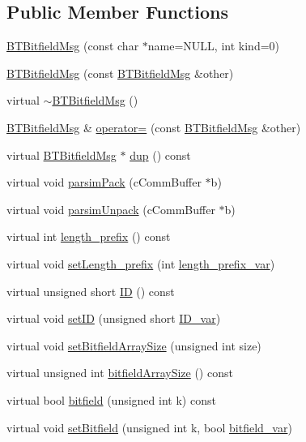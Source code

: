 \subsection*{Public Member Functions}
\begin{DoxyCompactItemize}
\item 
\hyperlink{classBTBitfieldMsg_ae71b7868e1f9b27629f6f391b352c911}{B\+T\+Bitfield\+Msg} (const char $\ast$name=N\+U\+L\+L, int kind=0)
\item 
\hyperlink{classBTBitfieldMsg_a3106cbcfeff6258360d37dd64ac337f8}{B\+T\+Bitfield\+Msg} (const \hyperlink{classBTBitfieldMsg}{B\+T\+Bitfield\+Msg} \&other)
\item 
virtual \hyperlink{classBTBitfieldMsg_a9233620b684aec4bbb3c1ae5db992962}{$\sim$\+B\+T\+Bitfield\+Msg} ()
\item 
\hyperlink{classBTBitfieldMsg}{B\+T\+Bitfield\+Msg} \& \hyperlink{classBTBitfieldMsg_a08e92e1add02c4b44de4b3c9805dff07}{operator=} (const \hyperlink{classBTBitfieldMsg}{B\+T\+Bitfield\+Msg} \&other)
\item 
virtual \hyperlink{classBTBitfieldMsg}{B\+T\+Bitfield\+Msg} $\ast$ \hyperlink{classBTBitfieldMsg_aa868c1c4c6f41c1e39eb740e7cd3f55f}{dup} () const 
\item 
virtual void \hyperlink{classBTBitfieldMsg_a8ae00cea21bf256b774a6a618516a1df}{parsim\+Pack} (c\+Comm\+Buffer $\ast$b)
\item 
virtual void \hyperlink{classBTBitfieldMsg_a793a3596151d3d008bf8268b30ab30a1}{parsim\+Unpack} (c\+Comm\+Buffer $\ast$b)
\item 
virtual int \hyperlink{classBTBitfieldMsg_a4b19acf793716974286b30e51a4ae6a6}{length\+\_\+prefix} () const 
\item 
virtual void \hyperlink{classBTBitfieldMsg_aa8a72966bdfa717d283efd63d1c77bc8}{set\+Length\+\_\+prefix} (int \hyperlink{classBTBitfieldMsg_a9040140b874e54a8dc67450a91ffb71b}{length\+\_\+prefix\+\_\+var})
\item 
virtual unsigned short \hyperlink{classBTBitfieldMsg_a0ab3c6abff00a0efe57031e83b34a926}{I\+D} () const 
\item 
virtual void \hyperlink{classBTBitfieldMsg_a80d7334c46ea207cdd2c269c155b7332}{set\+I\+D} (unsigned short \hyperlink{classBTBitfieldMsg_a9b73c5b2ce95effc48060f120ac49062}{I\+D\+\_\+var})
\item 
virtual void \hyperlink{classBTBitfieldMsg_a502a312ee81437e26312b20d3889d548}{set\+Bitfield\+Array\+Size} (unsigned int size)
\item 
virtual unsigned int \hyperlink{classBTBitfieldMsg_adac91263151d7859e2f0465172fa01d4}{bitfield\+Array\+Size} () const 
\item 
virtual bool \hyperlink{classBTBitfieldMsg_acc2ab9019bbbbdf32111a21240cc23d9}{bitfield} (unsigned int k) const 
\item 
virtual void \hyperlink{classBTBitfieldMsg_a5e0e12234ad65a8e1b386229951b7b74}{set\+Bitfield} (unsigned int k, bool \hyperlink{classBTBitfieldMsg_aef51fc463d47fdaefb5db5eec449448d}{bitfield\+\_\+var})
\end{DoxyCompactItemize}
